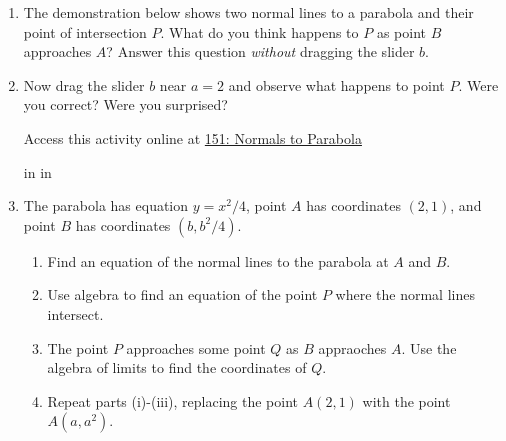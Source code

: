 \documentclass{ximera}
\newcommand{\pskip}{\vskip 0.1 in}
\begin{document}
\begin{question}  \label{Qwerdfggg}
\begin{enumerate}
\item The demonstration below shows two normal lines to a parabola and their point of intersection $P$. What do you think happens to $P$ as point $B$ approaches $A$? Answer this question \emph{without} dragging the slider $b$.
\begin{freeResponse}
\end{freeResponse}

\item Now drag the slider $b$ near $a=2$ and observe what happens to point $P$. Were you correct? Were you surprised?
\begin{freeResponse}
\end{freeResponse}


 
\begin{onlineOnly}
    \begin{center}
\end{center}
\end{onlineOnly}
Access this activity online at \href{https://www.desmos.com/calculator/ybaivhc2tl}{151: Normals to Parabola}

\pskip \pskip

\item The parabola has equation $y=x^2/4$, point $A$ has coordinates $(2,1)$, and point $B$ has coordinates $(b,b^2/4)$. 

\begin{enumerate}
\item Find an equation of the normal lines to the parabola at $A$ and $B$.

\item Use algebra to find an equation of the point $P$ where the normal lines intersect.

\item The point $P$ approaches some point $Q$ as $B$ appraoches $A$. Use the algebra of limits to find the coordinates of $Q$.


\item Repeat parts (i)-(iii), replacing the point $A(2,1)$ with the point $A(a,a^2)$.
\end{enumerate}
\end{enumerate}
\end{question}
\end{document}
